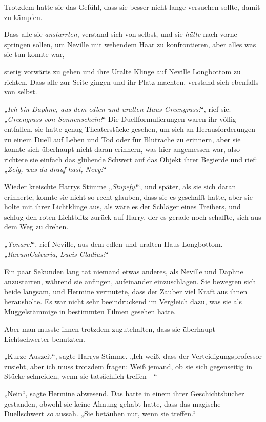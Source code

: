 {Trotzdem hatte sie das Gefühl, dass sie besser nicht lange versuchen sollte, damit zu kämpfen.

Dass alle sie \emph{anstarrten}, verstand sich von selbst, und sie \emph{hätte} nach vorne springen sollen, um Neville mit wehendem Haar zu konfrontieren, aber alles was sie tun konnte war,

stetig vorwärts zu gehen und ihre Uralte Klinge auf Neville Longbottom zu richten. Dass alle zur Seite gingen und ihr Platz machten, verstand sich ebenfalls von selbst.

„\emph{Ich bin Daphne, aus dem edlen und uralten Haus Greengrass!}“, rief sie. „\emph{Greengrass von Sonnenschein!}“ Die Duellformulierungen waren ihr völlig entfallen, sie hatte genug Theaterstücke gesehen, um sich an Herausforderungen zu einem Duell auf Leben und Tod oder für Blutrache zu erinnern, aber sie konnte sich überhaupt nicht daran erinnern, was hier angemessen war, also richtete sie einfach das glühende Schwert auf das Objekt ihrer Begierde und rief: „\emph{Zeig, was du drauf hast,} \emph{Nevy!}“

Wieder kreischte Harrys Stimme „\emph{Stupefy!}“, und später, als sie sich daran erinnerte, konnte sie nicht so recht glauben, dass sie es geschafft hatte, aber sie holte mit ihrer Lichtklinge aus, als wäre es der Schläger eines Treibers, und schlug den roten Lichtblitz zurück auf Harry, der es gerade noch schaffte, sich aus dem Weg zu drehen.

„\emph{Tonare!}“, rief Neville, aus dem edlen und uralten Haus Longbottom. „\emph{RavumCalvaria}, \emph{Lucis} \emph{Gladius!}“

Ein paar Sekunden lang tat niemand etwas anderes, als Neville und Daphne anzustarren, während sie anfingen, aufeinander einzuschlagen. Sie bewegten sich beide langsam, und Hermine vermutete, dass der Zauber viel Kraft aus ihnen herausholte. Es war nicht sehr beeindruckend im Vergleich dazu, was sie als Muggelstämmige in bestimmten Filmen gesehen hatte.

Aber man musste ihnen trotzdem zugutehalten, dass sie überhaupt Lichtschwerter benutzten.

„Kurze Auszeit“, sagte Harrys Stimme. „Ich weiß, dass der Verteidigungsprofessor zusieht, aber ich muss trotzdem fragen: Weiß jemand, ob sie sich gegenseitig in Stücke schneiden, wenn sie tatsächlich treffen—“

„Nein“, sagte Hermine abwesend. Das hatte in einem ihrer Geschichtsbücher gestanden, obwohl sie keine Ahnung gehabt hatte, dass das magische Duellschwert \emph{so} aussah. „Sie betäuben nur, wenn sie treffen.“

}

